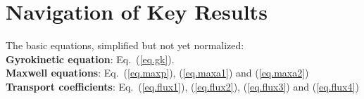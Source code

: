 \chapter{Navigation of Key Results}

The basic equations, simplified but not yet normalized:\\

\noindent
{\bf Gyrokinetic equation}: 
 Eq.~(\ref{eq.gk}).\\

\noindent
{\bf Maxwell equations}: 
 Eq.~(\ref{eq.maxp}), (\ref{eq.maxa1}) and (\ref{eq.maxa2})\\

\noindent
{\bf Transport coefficients}: 
 Eq.~(\ref{eq.flux1}), (\ref{eq.flux2}), (\ref{eq.flux3}) and (\ref{eq.flux4})\\


